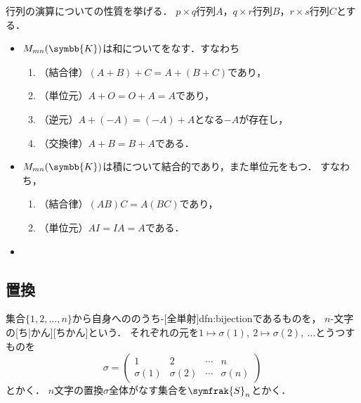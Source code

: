 \documentclass[../sotsu.tex]{subfiles}
\begin{document}
\begin{proposition}
    行列の演算についての性質を挙げる．
    $p \times q$行列$A$，$q \times r$行列$B$，$r \times s$行列$C$とする．
    \begin{itemize}
        \item $M_{mn}(\symbb{K})$は和についてをなす．すなわち
        \begin{enumerate}
            \item （結合律）$(A + B) + C = A + (B + C)$であり，
            \item （単位元）$A + O = O + A = A$であり，
            \item （逆元）$A + (-A) = (-A) + A$となる$-A$が存在し，
            \item （交換律）$A + B = B + A$である．
        \end{enumerate}
        \item $M_{mn}(\symbb{K})$は積について結合的であり，また単位元をもつ．
            すなわち，
        \begin{enumerate}
            \item （結合律）$(AB)C = A(BC)$であり，
            \item （単位元）$AI = IA = A$である．
        \end{enumerate}
        \item 
    \end{itemize}
\end{proposition}



\subsection{置換}

\begin{definition}
    \label{dfn:permutation}
    集合$\{ 1, 2, \dots, n \}$から自身へののうち-[全単射]{dfn:bijection}であるものを，
    $n$-文字の[ち|かん][ちかん]という．
    それぞれの元を$1 \mapsto \sigma(1), \  2 \mapsto \sigma(2), \  \dotsc$とうつすものを
    \begin{equation*}
        \sigma = 
        \begin{pmatrix}
                   1  &        2  & \cdots &        n  \\
            \sigma(1) & \sigma(2) & \cdots & \sigma(n)
        \end{pmatrix}
    \end{equation*}
    とかく．
    $n$文字の置換$\sigma$全体がなす集合を$\symfrak{S}_n$とかく．
\end{definition}
\end{document}
